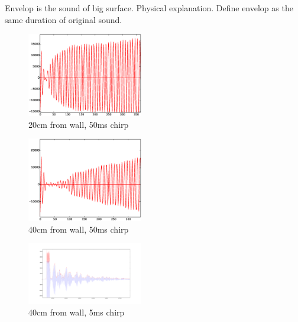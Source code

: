 Envelop is the sound of big surface. Physical explanation. 
Define envelop as the same duration of original sound.



\begin{figure}[H]
\centering
\includegraphics[width=0.45\textwidth]{./fig/20cm.eps}
\caption{20cm from wall, 50ms chirp}
\end{figure}

\begin{figure}[H]
\centering
\includegraphics[width=0.45\textwidth]{./fig/40cm.eps}
\caption{40cm from wall, 50ms chirp}
\end{figure}

\begin{figure}[H]
\centering
\includegraphics[width=0.45\textwidth]{./fig/inroom.pdf}
\caption{40cm from wall, 5ms chirp}
\end{figure}








